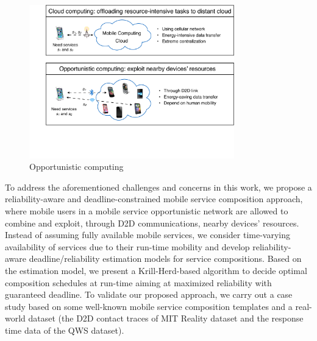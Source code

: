 \documentclass[journal]{IEEEtran}
\begin{document}
\begin{figure}[!t]
\centering
\includegraphics[width=3.5in]{./img/pic1.pdf}
\caption{Opportunistic computing}
\label{Opportunistic computing}
\end{figure}



To address the aforementioned challenges and concerns in this work, we propose a reliability-aware and deadline-constrained mobile service composition approach, where mobile users in a mobile service opportunistic network are allowed to combine and exploit, through D2D communications, nearby devices' resources. Instead of assuming fully available mobile services, we consider time-varying availability of services due to their run-time mobility and develop reliability-aware deadline/reliability estimation models for service compositions. Based on the estimation model, we present a Krill-Herd-based algorithm to decide optimal composition schedules at run-time aiming at maximized reliability with guaranteed deadline. To validate our proposed approach, we carry out a case study based on some well-known mobile service composition templates and a real-world dataset (the D2D contact traces of MIT Reality dataset and the response time data of the QWS dataset).
\end{document}
